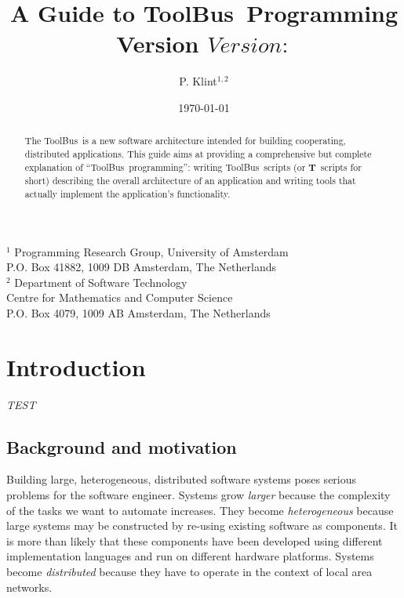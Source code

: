 \documentclass[a4,twoside,noweb]{article} %
\begin{document}
\newcommand{\TB}{{\sc ToolBus}}
\newcommand{\T}{{\bf T}}
\newcommand{\spec}[1]{{\rm #1}}
\newcommand{\script}[1]{{\tt #1}}
\newcommand{\ASFSDF}{{\sc Asf+Sdf}}
\newcommand{\ASF}{{\sc Asf}}
\newcommand{\SDF}{{\sc Sdf}}
\newcommand{\GEL}{{\sc Gel}}
\newcommand{\iter}{\,^*\,}
\newcommand{\emp}[1]{{\em #1}}
\newcommand{\txttt}[1]{{\tt #1}}

%

\title{A Guide to \TB\ Programming\\
Version $Version: $}
\author{P. Klint$^{1,2}$}
\date{\today}
\maketitle
\begin{center}
       {\footnotesize $^1$ Programming Research Group, University of Amsterdam\\
        P.O. Box 41882, 1009 DB Amsterdam, The Netherlands\\
        $^2$ Department of Software Technology\\
        Centre for Mathematics and Computer Science\\
        P.O. Box 4079, 1009 AB Amsterdam, The Netherlands}
\end{center}

\begin{abstract}
The \TB\ is a new software architecture intended for building
cooperating, distributed applications.  This guide aims at providing a
comprehensive but complete explanation of ``\TB\ programming'':
writing \TB{}ripts (or \T\ scripts for short) describing the overall architecture of an
application and writing tools that actually implement the application's
functionality.

\end{abstract}
\tableofcontents

\newpage

\section{Introduction}

{\em TEST}
\subsection{Background and motivation}
Building large, heterogeneous, distributed software systems poses
serious problems for the software engineer.  Systems grow {\em larger}
because the complexity of the tasks we want to automate
increases.  They become {\em heterogeneous} because large systems may be
constructed by re-using existing software as components.
It is more than likely that these components have been developed
using different implementation languages and run on different
hardware platforms.
Systems become {\em distributed} because they have to operate
in the context of local area networks.
\end{document}
